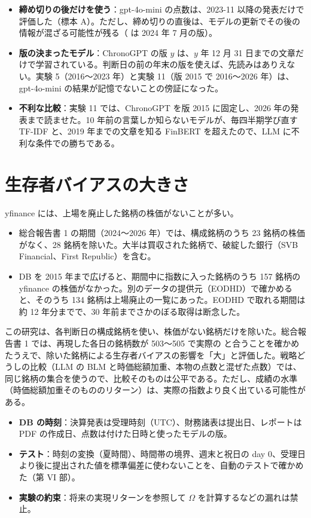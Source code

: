 \begin{itemize}
\item \textbf{締め切りの後だけを使う}：gpt-4o-mini の点数は、2023-11 以降の発表だけで評価した（標本 A）。ただし、締め切りの直後は、モデルの更新でその後の情報が混ざる可能性が残る（ は 2024 年 7 月の版）。
\item \textbf{版の決まったモデル}：ChronoGPT の版 $y$ は、$y$ 年 12 月 31 日までの文章だけで学習されている。判断日の前の年末の版を使えば、先読みはありえない。実験 5（2016〜2023 年）と実験 11（版 2015 で 2016〜2026 年）は、gpt-4o-mini の結果が記憶でないことの傍証になった。
\item \textbf{不利な比較}：実験 11 では、ChronoGPT を版 2015 に固定し、2026 年の発表まで読ませた。10 年前の言葉しか知らないモデルが、毎四半期学び直す TF-IDF と、2019 年までの文章を知る FinBERT を超えたので、LLM に不利な条件での勝ちである。
\end{itemize}

\section{生存者バイアスの大きさ}

yfinance には、上場を廃止した銘柄の株価がないことが多い。

\begin{itemize}
\item 総合報告書 1 の期間（2024〜2026 年）では、構成銘柄のうち 23 銘柄の株価がなく、28 銘柄を除いた。大半は買収された銘柄で、破綻した銀行（SVB Financial、First Republic）を含む。
\item DB を 2015 年まで広げると、期間中に指数に入った銘柄のうち 157 銘柄の yfinance の株価がなかった。別のデータの提供元（EODHD）で確かめると、そのうち 134 銘柄は上場廃止の一覧にあった。EODHD で取れる期間は約 12 年分までで、30 年前までさかのぼる取得は断念した。
\end{itemize}

この研究は、各判断日の構成銘柄を使い、株価がない銘柄だけを除いた。総合報告書 1 では、再現した各日の銘柄数が 503〜505 で実際の \SP{} と合うことを確かめたうえで、除いた銘柄による生存者バイアスの影響を「大」と評価した。戦略どうしの比較（LLM の BLM と時価総額加重、本物の点数と混ぜた点数）では、同じ銘柄の集合を使うので、比較そのものは公平である。ただし、成績の水準（時価総額加重そのもののリターン）は、実際の指数より良く出ている可能性がある。

\begin{projbox}
\begin{itemize}
\item \textbf{DB の時刻}：決算発表は受理時刻（UTC）、財務諸表は提出日、レポートは PDF の作成日、点数は付けた日時と使ったモデルの版。
\item \textbf{テスト}：時刻の変換（夏時間）、時間帯の境界、週末と祝日の day 0、受理日より後に提出された値を標準偏差に使わないことを、自動のテストで確かめた（第 VI 部）。
\item \textbf{実験の約束}：将来の実現リターンを参照して $\Omega$ を計算するなどの漏れは禁止。
\end{itemize}
\end{projbox}

